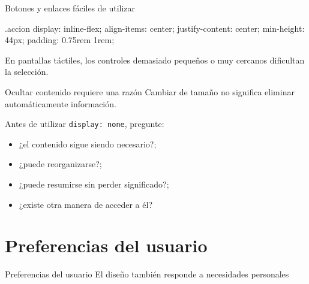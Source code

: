 \documentclass[aspectratio=169,11pt]{beamer}
\begin{document}
    \begin{frame}[fragile]{Botones y enlaces fáciles de utilizar}
        \begin{csscodedark}
            .accion {
                display: inline-flex;
                align-items: center;
                justify-content: center;
                min-height: 44px;
                padding: 0.75rem 1rem;
            }
        \end{csscodedark}

        En pantallas táctiles, los controles demasiado pequeños o muy cercanos
        dificultan la selección.

    \end{frame}

    \begin{frame}{Ocultar contenido requiere una razón}
        Cambiar de tamaño no significa eliminar automáticamente información.

        Antes de utilizar \texttt{display: none}, pregunte:

        \begin{itemize}
            \item ¿el contenido sigue siendo necesario?;
            \item ¿puede reorganizarse?;
            \item ¿puede resumirse sin perder significado?;
            \item ¿existe otra manera de acceder a él?
        \end{itemize}

    \end{frame}

    \section{Preferencias del usuario}

    \SectionSlide
    {Preferencias del usuario}
    {El diseño también responde a necesidades personales}
\end{document}

